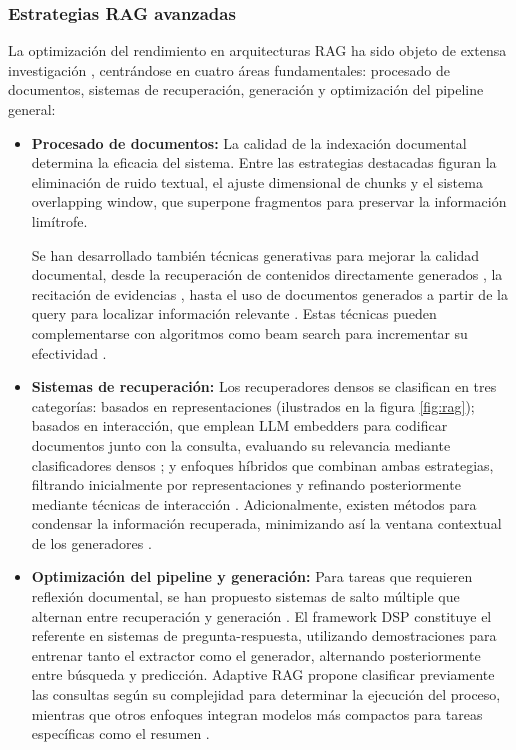 \subsubsection{Estrategias RAG avanzadas}
La optimización del rendimiento en arquitecturas RAG ha sido objeto de extensa investigación \cite{zhu_retrieving_2021}\cite{gao_retrieval-augmented_2024}, centrándose en cuatro áreas fundamentales: procesado de documentos, sistemas de recuperación, generación y optimización del pipeline general:
\begin{itemize}
  \item {\textbf{Procesado de documentos:}} La calidad de la indexación documental determina la eficacia del sistema. Entre las estrategias destacadas figuran la eliminación de ruido textual, el ajuste dimensional de chunks y el sistema overlapping window, que superpone fragmentos para preservar la información limítrofe. 
  
  Se han desarrollado también técnicas generativas para mejorar la calidad documental, desde la recuperación de contenidos directamente generados \cite{yu_generate_2023}, la recitación de evidencias \cite{sun_recitation-augmented_2023}, hasta el uso de documentos generados a partir de la query para localizar información relevante \cite{gao_precise_2023}. Estas técnicas pueden complementarse con algoritmos como beam search para incrementar su efectividad \cite{cheng_lift_nodate}\cite{cho_improving_2023-1}\cite{yoran_answering_2024}.
  
  \item {\textbf{Sistemas de recuperación:}} Los recuperadores densos se clasifican en tres categorías: basados en representaciones (ilustrados en la figura \ref{fig:rag}); basados en interacción, que emplean LLM embedders para codificar documentos junto con la consulta, evaluando su relevancia mediante clasificadores densos \cite{ma_query_nodate}\cite{levine_standing_2022}; y enfoques híbridos que combinan ambas estrategias, filtrando inicialmente por representaciones y refinando posteriormente mediante técnicas de interacción \cite{khattab_relevance-guided_2021}. Adicionalmente, existen métodos para condensar la información recuperada, minimizando así la ventana contextual de los generadores \cite{khattab_baleen_nodate}\cite{xu_recomp_2023}.
  
  \item {\textbf{Optimización del pipeline y generación:}} Para tareas que requieren reflexión documental, se han propuesto sistemas de salto múltiple que alternan entre recuperación y generación \cite{shao_enhancing_2023}\cite{qi_answering_2021}\cite{zheng_take_2024}\cite{trivedi_interleaving_2023}. El framework DSP \cite{khattab_demonstrate-search-predict_2023} constituye el referente en sistemas de pregunta-respuesta, utilizando demostraciones para entrenar tanto el extractor como el generador, alternando posteriormente entre búsqueda y predicción. Adaptive RAG \cite{jeong_adaptive-rag_2024} propone clasificar previamente las consultas según su complejidad para determinar la ejecución del proceso, mientras que otros enfoques integran modelos más compactos para tareas específicas como el resumen \cite{ma_large_2023}.
\end{itemize}

